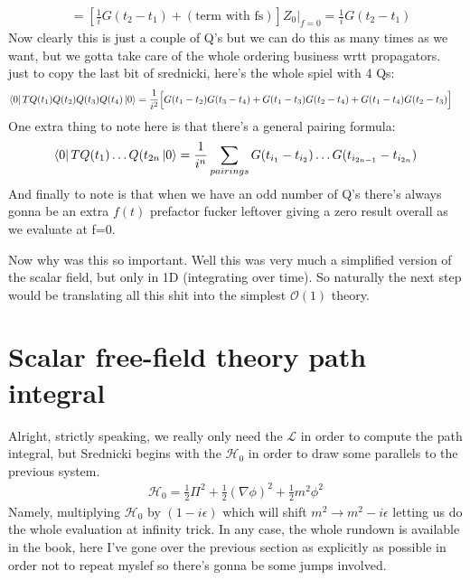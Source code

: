 \documentclass[10pt]{article}
\begin{document}
\begin{align}
			    &= \left[ \frac{1}{i} G(t_2-t_1) + (\text{term with fs}) \right] Z_0 \Big\rvert_{f=0} = \frac{1}{i}G(t_2-t_1)
\end{align}
Now clearly this is just a couple of Q's but we can do this as many times as we want, but we gotta take care of the whole ordering business wrtt propagators. just to copy the last bit of srednicki, here's the whole spiel with 4 Qs:
\begin{align}
	\bra{0}TQ(t_1)Q(t_2)Q(t_3)Q(t_4)\ket{0} &=  \frac{1}{i^2}\Big[G(t_1-t_2)G(t_3-t_4) + G(t_1-t_3)G(t_2-t_4) + G(t_1-t_4)G(t_2-t_3)\Big]
\end{align}
One extra thing to note here is that there's a general pairing formula:
\begin{align}
	\bra{0}TQ(t_1)\ldots Q(t_{2n}\ket{0} = \frac{1}{i^n} \sum_{pairings}G(t_{i_1}-t_{i_2})\ldots G(t_{i_{2n-1}}-t_{i_{2n}})
\end{align}
And finally to note is that when we have an odd number of Q's there's always gonna be an extra $f(t)$ prefactor fucker leftover giving a zero result overall as we evaluate at f=0.\par
Now why was this so important. Well this was very much a simplified version of the scalar field, but only in 1D (integrating over time). So naturally the next step would be translating all this shit into the simplest $\mathcal{O}(1)$ theory.

\section*{Scalar free-field theory path integral}%
Alright, strictly speaking, we really only need the $\mathcal{L}$ in order to compute the path integral, but Srednicki begins with the $\mathcal{H}_0$ in order to draw some parallels to the previous system.
\begin{align}
	\mathcal{H}_0	= \frac{1}{2} \Pi^2 + \frac{1}{2}(\nabla \phi)^2 + \frac{1}{2}m^2 \phi^2
\end{align}
Namely, multiplying $\mathcal{H}_0$ by $(1-i\epsilon)$ which will shift $m^2 \rightarrow m^2-i\epsilon$ letting us do the whole evaluation at infinity trick. In any case, the whole rundown is available in the book, here I've gone over the previous section as explicitly as possible in order not to repeat myslef so there's gonna be some jumps involved.\par
\end{document}
